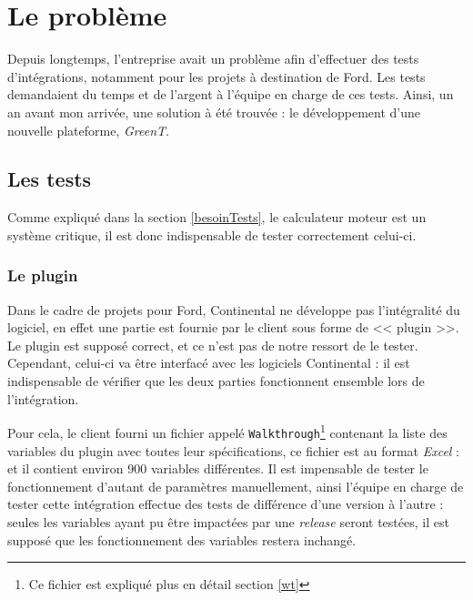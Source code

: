 \chapter{Le problème} \label{chapPb}
\begin{figure}
\vspace{-25px}
\hspace{-30px}
\begin{minipage}{0.67\textwidth}
\minitoc
\end{minipage}
\end{figure}
Depuis longtemps, l'entreprise avait un problème afin d'effectuer des tests d'intégrations, notamment pour les projets à destination de Ford. Les tests demandaient du temps et de l'argent à l'équipe en charge de ces tests. Ainsi, un an avant mon arrivée, une solution à été trouvée : le développement d'une nouvelle plateforme, \textit{GreenT}.

\vspace{-32px}
	\section{Les tests} \label{pbTests}
	Comme expliqué dans la section \ref{besoinTests}, le calculateur moteur est un système critique, il est donc indispensable de tester correctement celui-ci.

	\subsection{Le plugin}
	Dans le cadre de projets pour Ford, Continental ne développe pas l'intégralité du logiciel, en effet une partie est fournie par le client sous forme de << plugin >>. Le plugin est supposé correct, et ce n'est pas de notre ressort de le tester. Cependant, celui-ci va être interfacé avec les logiciels Continental : il est indispensable de vérifier que les deux parties fonctionnent ensemble lors de l'intégration.

	Pour cela, le client fourni un fichier appelé \texttt{Walkthrough}\footnote{Ce fichier est expliqué plus en détail section \ref{wt}} contenant la liste des variables du plugin avec toutes leur spécifications, ce fichier est au format \textit{Excel} : et il contient environ 900 variables différentes. Il est impensable de tester le fonctionnement d'autant de paramètres manuellement, ainsi l'équipe en charge de tester cette intégration effectue des tests de différence d'une version à l'autre : seules les variables ayant pu être impactées par une \textit{release} seront testées, il est supposé que les fonctionnement des variables restera inchangé.

